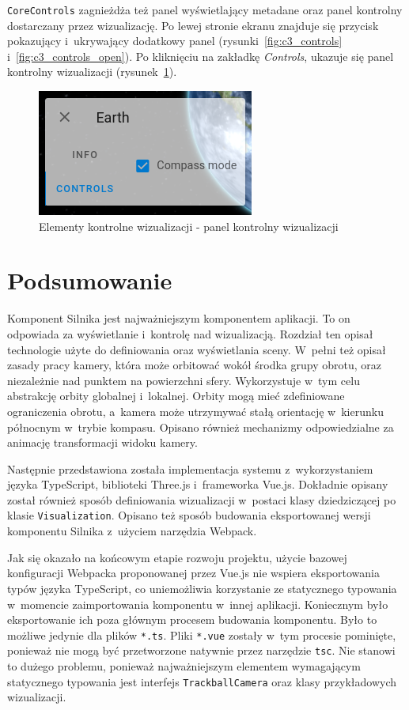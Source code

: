 \begin{samepage}
\texttt{CoreControls} zagnieżdża też panel wyświetlający metadane oraz panel kontrolny dostarczany przez wizualizację. Po lewej stronie ekranu znajduje się przycisk pokazujący i~ukrywający dodatkowy panel (rysunki~\ref{fig:c3_controls} i~\ref{fig:c3_controls_open}). Po kliknięciu na zakładkę \textit{Controls}, ukazuje się panel kontrolny wizualizacji (rysunek~\ref{fig:c3_controls_earth}).
\end{samepage}

\begin{figure}
    \centering
    \includegraphics[scale=2.1]{img/c3_controls_earth.png}
    \caption{Elementy kontrolne wizualizacji - panel kontrolny wizualizacji}
    \label{fig:c3_controls_earth} 
\end{figure}

\section{Podsumowanie}

Komponent Silnika jest najważniejszym komponentem aplikacji. To on odpowiada za wyświetlanie i~kontrolę nad wizualizacją. Rozdział ten opisał technologie użyte do definiowania oraz wyświetlania sceny. W~pełni też opisał zasady pracy kamery, która może orbitować wokół środka grupy obrotu, oraz niezależnie nad punktem na powierzchni sfery. Wykorzystuje w~tym celu abstrakcję orbity globalnej i~lokalnej. Orbity mogą mieć zdefiniowane ograniczenia obrotu, a~kamera może utrzymywać stałą orientację w~kierunku północnym w~trybie kompasu. Opisano również mechanizmy odpowiedzialne za animację transformacji widoku kamery.

Następnie przedstawiona została implementacja systemu z~wykorzystaniem języka TypeScript, biblioteki Three.js i~frameworka Vue.js. Dokładnie opisany został również sposób definiowania wizualizacji w~postaci klasy dziedziczącej po klasie \texttt{Visualization}. Opisano też sposób budowania eksportowanej wersji komponentu Silnika z~użyciem narzędzia Webpack.

Jak się okazało na końcowym etapie rozwoju projektu, użycie bazowej konfiguracji \mbox{Webpacka} proponowanej przez Vue.js nie wspiera eksportowania typów języka TypeScript, co uniemożliwia korzystanie ze statycznego typowania w~momencie zaimportowania komponentu w~innej aplikacji. Koniecznym było eksportowanie ich poza głównym procesem budowania komponentu. Było to możliwe jedynie dla plików \texttt{*.ts}. Pliki \texttt{*.vue} zostały w~tym procesie pominięte, ponieważ nie mogą być przetworzone natywnie przez narzędzie \texttt{tsc}. Nie stanowi to dużego problemu, ponieważ najważniejszym elementem wymagającym statycznego typowania jest interfejs \texttt{TrackballCamera} oraz klasy przykładowych wizualizacji.

